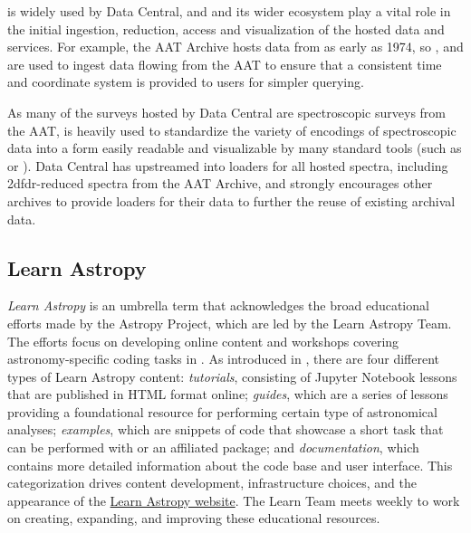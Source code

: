 \documentclass[modern]{aastex631}
\newcommand{\secauthor}[1]{{\color{blue}Author:~\textit{#1}}}
\newcommand{\secunfilled}{{\color{red}Author:~\textit{Looking for volunteers!}}}
\begin{document}
\python is widely used by Data Central, and \astropy and its wider ecosystem
play a vital role in the initial ingestion, reduction, access and visualization
of the hosted data and services. For example, the AAT Archive hosts data from as early as
1974, so \astropycoordinates, \astropytime and \astropyfits are used to ingest
data flowing from the AAT to ensure that a consistent time and coordinate system
is provided to users for simpler querying.

As many of the surveys hosted by Data Central are spectroscopic surveys from the
AAT,  is heavily used to standardize the variety of encodings
of spectroscopic data into a form easily readable and visualizable by many
standard tools (such as  or ). Data Central has
upstreamed into  loaders for all hosted spectra, including
2dfdr-reduced spectra from the AAT Archive, and strongly encourages other
archives to provide loaders for their data to further the reuse of existing archival
data.



\subsection{Learn Astropy} \label{sec:learn}



\textit{Learn Astropy} is an umbrella term that acknowledges the broad
educational efforts made by the Astropy Project, which are led by the Learn
Astropy Team.
The efforts focus on developing online content and workshops covering
astronomy-specific coding tasks in \python.
As introduced in \citet{astropy:2018}, there are four different types of
Learn Astropy content: \textit{tutorials}, consisting of Jupyter Notebook
lessons that are published in HTML format online; \textit{guides}, which are a
series of lessons providing a foundational resource for performing certain
type of astronomical analyses; \textit{examples}, which are snippets of code
that showcase a short task that can be performed with \astropypkg or an affiliated
package; and \textit{documentation}, which contains more detailed information
about the code base and user interface.
This categorization drives content development, infrastructure choices, and the
appearance of the \href{https://learn.astropy.org}{Learn Astropy website}.
The Learn Team meets weekly to work on creating, expanding, and improving these
educational resources.
\end{document}
